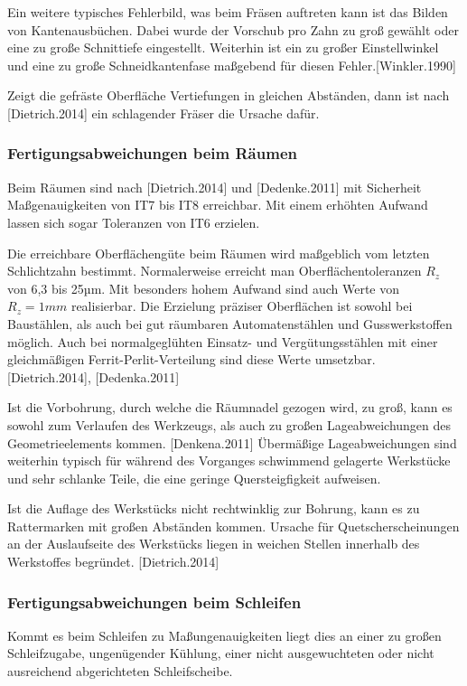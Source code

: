 Ein weitere typisches Fehlerbild, was beim Fräsen auftreten kann ist das Bilden von Kantenausbüchen. Dabei wurde der Vorschub pro Zahn zu groß gewählt oder eine zu große Schnittiefe eingestellt. Weiterhin ist ein zu großer Einstellwinkel und eine zu große Schneidkantenfase maßgebend für diesen Fehler.[Winkler.1990]

Zeigt die gefräste Oberfläche Vertiefungen in gleichen Abständen, dann ist nach [Dietrich.2014] ein schlagender Fräser die Ursache dafür. 

\subsubsection{Fertigungsabweichungen beim Räumen}

Beim Räumen sind nach [Dietrich.2014] und [Dedenke.2011] mit Sicherheit Maßgenauigkeiten von IT7 bis IT8 erreichbar. Mit einem erhöhten Aufwand lassen sich sogar Toleranzen von IT6 erzielen.

Die erreichbare Oberflächengüte beim Räumen wird maßgeblich vom letzten Schlichtzahn bestimmt.
Normalerweise erreicht man Oberflächentoleranzen $R_{z}$ von 6,3 bis 25µm. Mit besonders hohem Aufwand sind auch Werte von $R_{z} = 1mm$ realisierbar. Die Erzielung präziser Oberflächen ist sowohl bei Baustählen, als auch bei gut räumbaren Automatenstählen und Gusswerkstoffen möglich. Auch bei normalgeglühten Einsatz- und Vergütungsstählen mit einer gleichmäßigen Ferrit-Perlit-Verteilung sind diese Werte umsetzbar. [Dietrich.2014], [Dedenka.2011]       

Ist die Vorbohrung, durch welche die Räumnadel gezogen wird, zu groß, kann es sowohl zum Verlaufen des Werkzeugs, als auch zu großen Lageabweichungen des Geometrieelements kommen. [Denkena.2011]
Übermäßige Lageabweichungen sind weiterhin typisch für während des Vorganges schwimmend gelagerte Werkstücke und sehr schlanke Teile, die eine geringe Quersteigfigkeit aufweisen. 

Ist die Auflage des Werkstücks nicht rechtwinklig zur Bohrung, kann es zu Rattermarken mit großen Abständen kommen. 
Ursache für Quetscherscheinungen an der Auslaufseite des Werkstücks liegen in weichen Stellen innerhalb des Werkstoffes begründet. [Dietrich.2014]    

\subsubsection{Fertigungsabweichungen beim Schleifen}

Kommt es beim Schleifen zu Maßungenauigkeiten liegt dies an einer zu großen Schleifzugabe, ungenügender Kühlung, einer nicht ausgewuchteten oder nicht ausreichend abgerichteten Schleifscheibe. 

